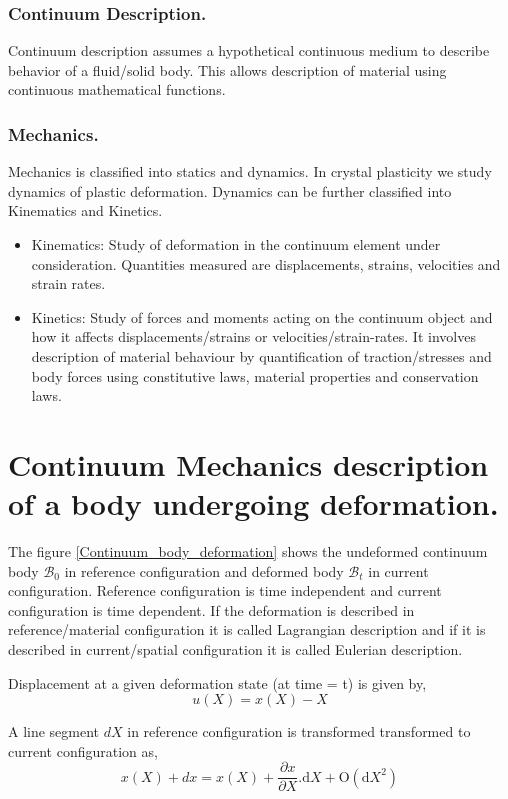 
\subsubsection{Continuum Description.}
Continuum description assumes a hypothetical continuous medium to describe behavior of a fluid/solid body. This allows description of material using continuous mathematical functions.

\subsubsection{Mechanics.}
Mechanics is classified into statics and dynamics. In crystal plasticity we study dynamics of plastic deformation. Dynamics can be further classified into Kinematics and Kinetics.

\begin{itemize}
    \item Kinematics: Study of deformation in the continuum element under consideration. Quantities measured are displacements, strains, velocities and strain rates.
    \item Kinetics: Study of forces and moments acting on the continuum object and how it affects displacements/strains or velocities/strain-rates. It involves description of material behaviour by quantification of traction/stresses and body forces using constitutive laws, material properties and conservation laws.
\end{itemize}

\section{Continuum Mechanics description of a body undergoing deformation.}

The figure \ref{Continuum_body_deformation} shows the undeformed continuum body $\mathcal{B}_0$ in reference configuration and deformed body $\mathcal{B}_t$ in current configuration. Reference configuration is time independent and current configuration is time dependent. If the deformation is described in reference/material configuration it is called Lagrangian description and if it is described in current/spatial configuration it is called Eulerian description.

Displacement at a given deformation state (at time = t) is given by,
\begin{equation}
\label{eq:A1}
    u(X) = x(X) - X
\end{equation}

A line segment $dX$ in reference configuration is transformed transformed to current configuration as,
\begin{equation}
\label{eq:A2}
    x(X) + dx = x(X) + \frac{\partial x}{\partial X}.\textrm{d}X + \textrm{O} (\textrm{d}X^2)
\end{equation}


